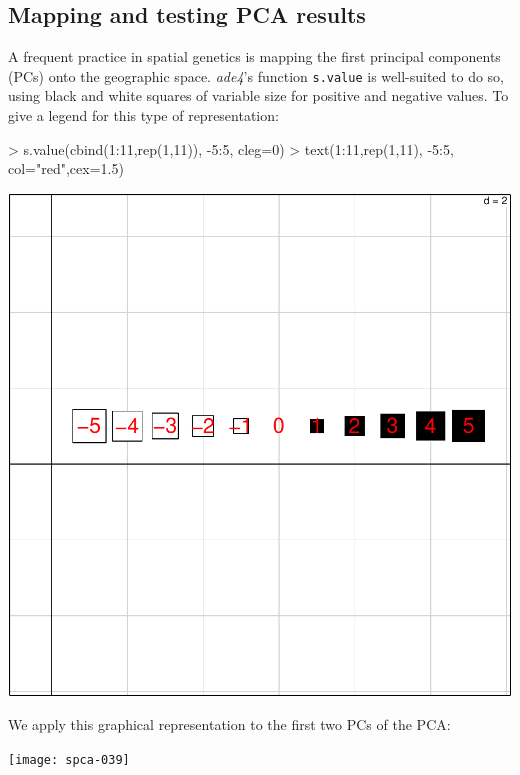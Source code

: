 \documentclass{article}
\begin{document}
\subsection{Mapping and testing PCA results}
A frequent practice in spatial genetics is mapping the first principal components (PCs) onto the geographic space.
\textit{ade4}'s function \texttt{s.value} is well-suited to do so, using black and
white squares of variable size for positive and negative values.
To give a legend for this type of representation:
\begin{Schunk}
\begin{Sinput}
> s.value(cbind(1:11,rep(1,11)), -5:5, cleg=0)
> text(1:11,rep(1,11), -5:5, col="red",cex=1.5)
\end{Sinput}
\end{Schunk}
\includegraphics{spca-svaluedem}

\noindent We apply this graphical representation to the first
two PCs of the PCA:
\begin{Schunk}
\end{Schunk}
\texttt{[image: spca-039]}
\end{document}
